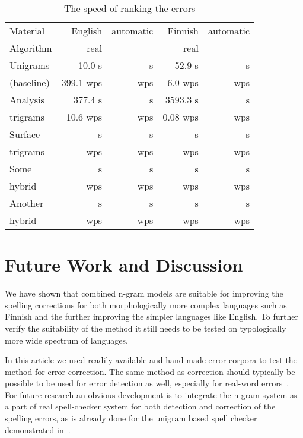 \documentclass[11pt,a4paper]{article}
\begin{document}
\begin{table}[h]
  \begin{center}
    \caption{The speed of ranking the errors
    \label{table:speed-eval}}
    \begin{scriptsize}
      \begin{tabular}{l|rrrr}
        \hline
        Material  & English & automatic & Finnish & automatic \\
        Algorithm & real    &           & real    &           \\
        \hline
        Unigrams   &    10.0 s &      s & 52.9 s &     s  \\
        (baseline) & 399.1 wps &    wps & 6.0 wps &   wps  \\
        \hline
        Analysis &   377.4 s &     s & 3593.3 s &     s  \\
        trigrams & 10.6  wps &   wps & 0.08 wps &   wps  \\
        \hline
        Surface  &      s &     s &     s &     s  \\
        trigrams &    wps &   wps &   wps &   wps  \\
        \hline
        Some     &      s &     s &     s &     s  \\
        hybrid   &    wps &   wps &   wps &   wps  \\
        \hline
        Another  &      s &     s &     s &     s  \\
        hybrid   &    wps &   wps &   wps &   wps  \\
        \hline
      \end{tabular}
    \end{scriptsize}
  \end{center}
\end{table}


\section{Future Work and Discussion}
\label{sec:future-work}

We have shown that combined n-gram models are suitable for improving the
spelling corrections for both morphologically more complex languages such as
Finnish and the further improving the simpler languages like English. To
further verify the suitability of the method it still needs to be tested on
typologically more wide spectrum of languages.

In this article we used readily available and hand-made error corpora to test
the method for error correction. The same method as correction should typically
be possible to be used for error detection as well, especially for real-word
errors~\cite{mays/1991}. For future research an obvious development is to
integrate the n-gram system as a part of real spell-checker system for both
detection and correction of the spelling errors, as is already done for the
unigram based spell checker demonstrated in~\cite{pirinen/2010/lrec}.
\end{document}
